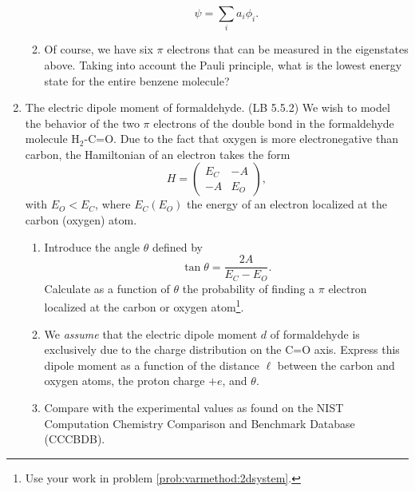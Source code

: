 \documentclass[letterpaper,11pt]{article}
\begin{document}
\begin{enumerate}
\begin{enumerate}
    $$ \psi = \sum_i a_i \phi_i. $$
    \item Of course, we have six $\pi$ electrons that can be measured in the eigenstates above. Taking into account the Pauli principle, what is the lowest energy state for the entire benzene molecule?
  \end{enumerate}
  \item The electric dipole moment of formaldehyde. (LB 5.5.2)
  We wish to model the behavior of the two $\pi$ electrons of the double bond in the formaldehyde molecule H$_2$-C=O. Due to the fact that oxygen is more electronegative than carbon, the Hamiltonian of an electron takes the form
  $$ H = \left( \begin{array}{cc} E_C & -A \\ -A & E_O \end{array} \right), $$
  with $E_O < E_C$, where $E_C(E_O)$ the energy of an electron localized at the carbon (oxygen) atom.
  \begin{enumerate}
    \item Introduce the angle $\theta$ defined by
    $$ \tan \theta = \frac{2A}{E_C - E_O}. $$
    Calculate as a function of $\theta$ the probability of finding a $\pi$ electron localized at the carbon or oxygen atom\footnote{Use your work in problem \ref{prob:varmethod:2dsystem}.}.
    \item We \emph{assume} that the electric dipole moment $d$ of formaldehyde is exclusively due to the charge distribution on the C=O axis. Express this dipole moment as a function of the distance $\ell$ between the carbon and oxygen atoms, the proton charge $+e$, and $\theta$.
    \item Compare with the experimental values as found on the NIST Computation Chemistry Comparison and Benchmark Database (CCCBDB).
  \end{enumerate}
\end{enumerate}
\end{document}
